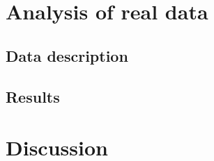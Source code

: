 
\section{Analysis of real data}
\subsection{Data description}
\subsection{Results}

\section{Discussion}


